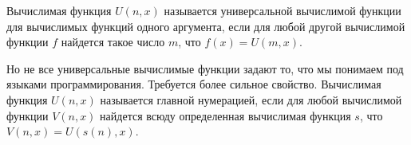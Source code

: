 Вычислимая функция $U(n, x)$ называется универсальной вычислимой функции для вычислимых функций одного аргумента, если для любой
другой вычислимой функции $f$ найдется такое число $m$, что $f(x) = U(m, x)$. 

Но не все универсальные вычислимые функции задают то, что мы понимаем под языками программирования. Требуется более сильное
свойство. Вычислимая функция $U(n, x)$ называется главной нумерацией, если для любой вычислимой функции $V(n, x)$ найдется всюду
определенная вычислимая функция $s$, что $V(n, x) = U(s(n), x)$.  